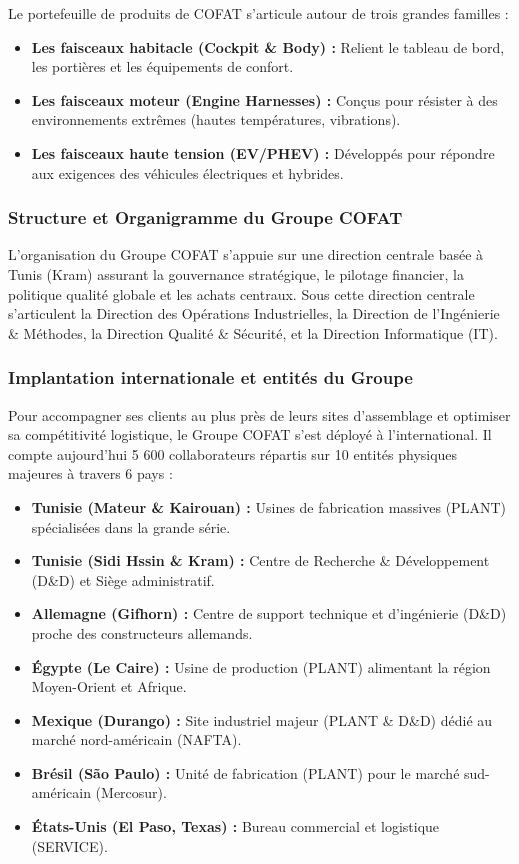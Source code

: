 Le portefeuille de produits de COFAT s'articule autour de trois grandes familles :
\begin{itemize}
    \item \textbf{Les faisceaux habitacle (Cockpit \& Body) :} Relient le tableau de bord, les portières et les équipements de confort.
    \item \textbf{Les faisceaux moteur (Engine Harnesses) :} Conçus pour résister à des environnements extrêmes (hautes températures, vibrations).
    \item \textbf{Les faisceaux haute tension (EV/PHEV) :} Développés pour répondre aux exigences des véhicules électriques et hybrides.
\end{itemize}

\subsubsection{Structure et Organigramme du Groupe COFAT}
L'organisation du Groupe COFAT s'appuie sur une direction centrale basée à Tunis (Kram) assurant la gouvernance stratégique, le pilotage financier, la politique qualité globale et les achats centraux. Sous cette direction centrale s'articulent la Direction des Opérations Industrielles, la Direction de l'Ingénierie & Méthodes, la Direction Qualité & Sécurité, et la Direction Informatique (IT).

\subsubsection{Implantation internationale et entités du Groupe}
Pour accompagner ses clients au plus près de leurs sites d'assemblage et optimiser sa compétitivité logistique, le Groupe COFAT s'est déployé à l'international. Il compte aujourd'hui 5 600 collaborateurs répartis sur 10 entités physiques majeures à travers 6 pays :
\begin{itemize}
    \item \textbf{Tunisie (Mateur \& Kairouan) :} Usines de fabrication massives (PLANT) spécialisées dans la grande série.
    \item \textbf{Tunisie (Sidi Hssin \& Kram) :} Centre de Recherche \& Développement (D\&D) et Siège administratif.
    \item \textbf{Allemagne (Gifhorn) :} Centre de support technique et d'ingénierie (D\&D) proche des constructeurs allemands.
    \item \textbf{Égypte (Le Caire) :} Usine de production (PLANT) alimentant la région Moyen-Orient et Afrique.
    \item \textbf{Mexique (Durango) :} Site industriel majeur (PLANT \& D\&D) dédié au marché nord-américain (NAFTA).
    \item \textbf{Brésil (São Paulo) :} Unité de fabrication (PLANT) pour le marché sud-américain (Mercosur).
    \item \textbf{États-Unis (El Paso, Texas) :} Bureau commercial et logistique (SERVICE).
\end{itemize}




